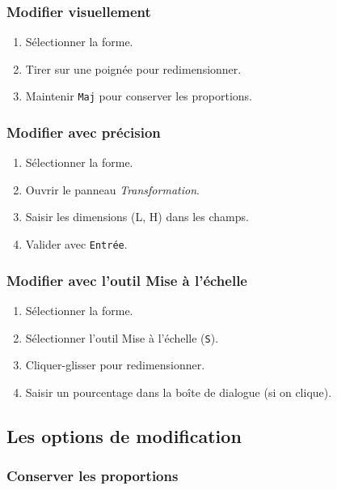 \subsubsection{Modifier visuellement}

\begin{enumerate}
    \item Sélectionner la forme.
    \item Tirer sur une poignée pour redimensionner.
    \item Maintenir \texttt{Maj} pour conserver les proportions.
\end{enumerate}

\subsubsection{Modifier avec précision}

\begin{enumerate}
    \item Sélectionner la forme.
    \item Ouvrir le panneau \emph{Transformation}.
    \item Saisir les dimensions (L, H) dans les champs.
    \item Valider avec \texttt{Entrée}.
\end{enumerate}

\subsubsection{Modifier avec l'outil Mise à l'échelle}

\begin{enumerate}
    \item Sélectionner la forme.
    \item Sélectionner l'outil Mise à l'échelle (\texttt{S}).
    \item Cliquer-glisser pour redimensionner.
    \item Saisir un pourcentage dans la boîte de dialogue (si on clique).
\end{enumerate}

\subsection{Les options de modification}

\subsubsection{Conserver les proportions}

